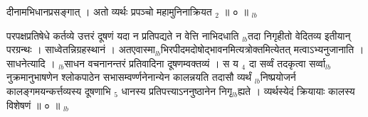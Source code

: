 \documentclass[article,12pt,a4paper]{memoir}%
\newcounter{parCount}
\begin{document}
\leavevmode{} दीनामभिधानप्रसङ्गात् । अतो व्यर्थः प्रपञ्चो महामुनिनाक्रियत {\tiny $_{2}$} ॥ ० ॥
	{}
	\pend%
      {\tiny $_{lb}$}

	  
	  \pstart \leavevmode%
	परपक्षप्रतिषेधे कर्तव्ये उत्तरं दूषणं यदा न प्रतिपद्यते न वेत्ति नाभिदधाति {\tiny $_{lb}$}तदा निगृहीतो वेदितव्य इतीयान् परग्रन्थः । साध्वेतन्निग्रहस्थानं । अतएवास्मा{\tiny $_{lb}$}भिरपीदमदोषोद्भावनमित्यत्रोक्तमित्येतत् मत्वाऽभ्यनुजानाति । {\color{DodgerBlue3}साधनेत्यादि} । {\tiny $_{lb}$}साधन वचनानन्तरं प्रतिवादिना दूषणम्वक्तव्यं । स य {\tiny $_{4}$} दा सर्व्वं तदकृत्वा सर्व्वा{\tiny $_{lb}$}नुक्रमानुभाषणेन श्लोकपाठेन सभासम्वर्ण्णनेनान्येन कालन्नयति तदासौ व्यर्थं {\tiny $_{lb}$}निष्प्रयोजर्न कालङ्गमयन्कर्त्तव्यस्य दूषणाभि {\tiny $_{5}$} धानस्य प्रतिपत्त्याऽननुष्ठानेन निगृ{\tiny $_{lb}$}ह्यते । व्यर्थस्येदं क्रियायाः कालस्य विशेषणं ॥ ० ॥
	{}
	\pend%
      {\tiny $_{lb}$}
\end{document}

